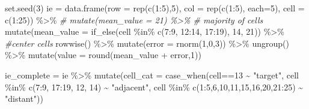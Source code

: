 \documentclass[
]{book}
\newenvironment{Shaded}{\begin{snugshade}}{\end{snugshade}}
\newcommand{\AttributeTok}[1]{\textcolor[rgb]{0.77,0.63,0.00}{#1}}
\newcommand{\CommentTok}[1]{\textcolor[rgb]{0.56,0.35,0.01}{\textit{#1}}}
\newcommand{\DecValTok}[1]{\textcolor[rgb]{0.00,0.00,0.81}{#1}}
\newcommand{\FunctionTok}[1]{\textcolor[rgb]{0.00,0.00,0.00}{#1}}
\newcommand{\NormalTok}[1]{#1}
\newcommand{\OtherTok}[1]{\textcolor[rgb]{0.56,0.35,0.01}{#1}}
\newcommand{\SpecialCharTok}[1]{\textcolor[rgb]{0.00,0.00,0.00}{#1}}
\newcommand{\StringTok}[1]{\textcolor[rgb]{0.31,0.60,0.02}{#1}}
\begin{document}
\begin{Shaded}
\begin{Highlighting}[]
\FunctionTok{set.seed}\NormalTok{(}\DecValTok{3}\NormalTok{)}
\NormalTok{ie }\OtherTok{=} \FunctionTok{data.frame}\NormalTok{(}\AttributeTok{row =} \FunctionTok{rep}\NormalTok{(}\FunctionTok{c}\NormalTok{(}\DecValTok{1}\SpecialCharTok{:}\DecValTok{5}\NormalTok{),}\DecValTok{5}\NormalTok{),}
                \AttributeTok{col =} \FunctionTok{rep}\NormalTok{(}\FunctionTok{c}\NormalTok{(}\DecValTok{1}\SpecialCharTok{:}\DecValTok{5}\NormalTok{), }\AttributeTok{each=}\DecValTok{5}\NormalTok{),}
                \AttributeTok{cell =} \FunctionTok{c}\NormalTok{(}\DecValTok{1}\SpecialCharTok{:}\DecValTok{25}\NormalTok{)) }\SpecialCharTok{\%\textgreater{}\%}
  \CommentTok{\# mutate(mean\_value = 21) \%\textgreater{}\% \# majority of cells}
  \FunctionTok{mutate}\NormalTok{(}\AttributeTok{mean\_value =} \FunctionTok{if\_else}\NormalTok{(cell }\SpecialCharTok{\%in\%} \FunctionTok{c}\NormalTok{(}\DecValTok{7}\SpecialCharTok{:}\DecValTok{9}\NormalTok{, }\DecValTok{12}\SpecialCharTok{:}\DecValTok{14}\NormalTok{, }\DecValTok{17}\SpecialCharTok{:}\DecValTok{19}\NormalTok{), }\DecValTok{14}\NormalTok{, }\DecValTok{21}\NormalTok{)) }\SpecialCharTok{\%\textgreater{}\%} \CommentTok{\#center cells}
  \FunctionTok{rowwise}\NormalTok{() }\SpecialCharTok{\%\textgreater{}\%}
  \FunctionTok{mutate}\NormalTok{(}\AttributeTok{error =} \FunctionTok{rnorm}\NormalTok{(}\DecValTok{1}\NormalTok{,}\DecValTok{0}\NormalTok{,}\DecValTok{3}\NormalTok{)) }\SpecialCharTok{\%\textgreater{}\%}
  \FunctionTok{ungroup}\NormalTok{() }\SpecialCharTok{\%\textgreater{}\%}
  \FunctionTok{mutate}\NormalTok{(}\AttributeTok{value =} \FunctionTok{round}\NormalTok{(mean\_value }\SpecialCharTok{+}\NormalTok{ error,}\DecValTok{1}\NormalTok{)) }

  
\NormalTok{ie\_complete }\OtherTok{=}\NormalTok{ ie }\SpecialCharTok{\%\textgreater{}\%}
  \FunctionTok{mutate}\NormalTok{(}\AttributeTok{cell\_cat =} \FunctionTok{case\_when}\NormalTok{(cell}\SpecialCharTok{==}\DecValTok{13} \SpecialCharTok{\textasciitilde{}} \StringTok{"target"}\NormalTok{,}
\NormalTok{                              cell }\SpecialCharTok{\%in\%} \FunctionTok{c}\NormalTok{(}\DecValTok{7}\SpecialCharTok{:}\DecValTok{9}\NormalTok{, }\DecValTok{17}\SpecialCharTok{:}\DecValTok{19}\NormalTok{, }\DecValTok{12}\NormalTok{, }\DecValTok{14}\NormalTok{) }\SpecialCharTok{\textasciitilde{}} \StringTok{"adjacent"}\NormalTok{,}
\NormalTok{                              cell }\SpecialCharTok{\%in\%} \FunctionTok{c}\NormalTok{(}\DecValTok{1}\SpecialCharTok{:}\DecValTok{5}\NormalTok{,}\DecValTok{6}\NormalTok{,}\DecValTok{10}\NormalTok{,}\DecValTok{11}\NormalTok{,}\DecValTok{15}\NormalTok{,}\DecValTok{16}\NormalTok{,}\DecValTok{20}\NormalTok{,}\DecValTok{21}\SpecialCharTok{:}\DecValTok{25}\NormalTok{) }\SpecialCharTok{\textasciitilde{}} \StringTok{"distant"}\NormalTok{)) }


\end{Highlighting}
\end{Shaded}
\end{document}
